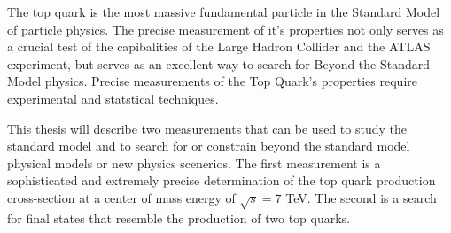 
%

The top quark is the most massive fundamental particle in the Standard Model of particle physics.
The precise measurement of it's properties not only serves as a crucial test of the capibalities of the Large Hadron Collider and the ATLAS experiment, but serves as an excellent way to search for Beyond the Standard Model physics.  
Precise measurements of the Top Quark's properties require experimental and statstical techniques.

This thesis will describe two measurements that can be used to study the standard model and to search for or constrain beyond the standard model physical models or new physics scenerios.
The first measurement is a sophisticated and extremely precise determination of the top quark production cross-section at a center of mass energy of $\sqrt{s} = 7$ TeV.
The second is a search for final states that resemble the production of two top quarks.


